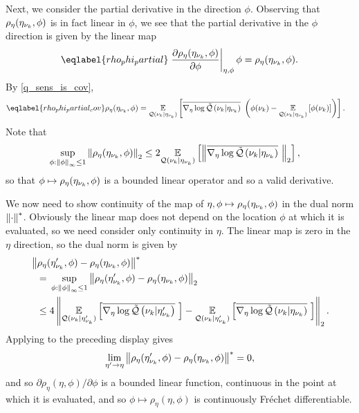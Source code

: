 Next, we consider the partial derivative in the direction $\phi$.  Observing
that $\rho_\eta(\eta_{\nu_{k}}, \phi)$ is in fact linear in $\phi$, we see that the
partial derivative in the $\phi$ direction is given by the linear map
%
\begin{align}\eqlabel{rho_phi_partial}
%
\fracat{\partial \rho_\eta(\etanuk, \phi)}
       {\partial \phi}{\eta, \phi} \phi =
    \rho_\eta(\etanuk, \phi).
%
\end{align}
%
By  \eqref{q_sens_is_cov},
%
\begin{align}\eqlabel{rho_phi_partial_cov}
%
\rho_\eta(\etanuk, \phi) ={}&
\expect{\q(\nuk \vert \etanuk)}
       {\lqgradbar{\nuk \vert \etanuk} \left(
        \phi(\nuk) - \expect{\q(\nuk \vert \etanuk)}{\phi(\nuk)}
       \right)
       }.
%
\end{align}
%
Note that
%
\begin{align*}
%
\sup_{\phi: \norminf{\phi} \le 1} \norm{\rho_\eta(\etanuk, \phi)}_2 \le{}&
    2 \expect{\q(\nuk \vert \etanuk)}
             {\norm{\lqgradbar{\nuk \vert \etanuk}}_2
             },
%
\end{align*}
%
so that $\phi \mapsto \rho_\eta(\eta_{\nu_{k}}, \phi)$ is a bounded linear operator and
so a valid derivative.

We now need to show continuity of the map of $\eta, \phi \mapsto
\rho_\eta(\eta_{\nu_{k}}, \phi)$ in the dual norm $\left\Vert\cdot\right\Vert^*$.  Obviously the
linear map does not depend on the location $\phi$ at which it is evaluated, so
we need consider only continuity in $\eta$.  The linear map is zero in the
$\eta$ direction, so the dual norm is given by
%
\begin{align*}
%
\MoveEqLeft
\norm{\rho_\eta(\etanuk', \phi) - \rho_\eta(\etanuk, \phi)}^* \\={}&
\sup_{\phi: \norminf{\phi} \le 1}
    \norm{\rho_\eta(\etanuk', \phi) - \rho_\eta(\etanuk, \phi)}_2 \\\le{}&
4 \norm{
    \expect{\q(\nuk \vert \etanuk')}{\lqgradbar{\nuk \vert \etanuk'}} -
    \expect{\q(\nuk \vert \etanuk')}{\lqgradbar{\nuk \vert \etanuk}}
}_2.
%
\end{align*}
%
Applying  to the preceding display gives
%
\begin{align*}
%
\lim_{\eta' \rightarrow \eta}
    \norm{\rho_\eta(\etanuk', \phi) - \rho_\eta(\etanuk, \phi)}^* = 0,
%
\end{align*}
%
and so $\partial \rho_\eta(\eta, \phi) / \partial \phi$ is a bounded linear
function, continuous in the point at which it is evaluated, and so $\phi \mapsto
\rho_\eta(\eta, \phi)$ is continuously Fr{\'e}chet differentiable.

